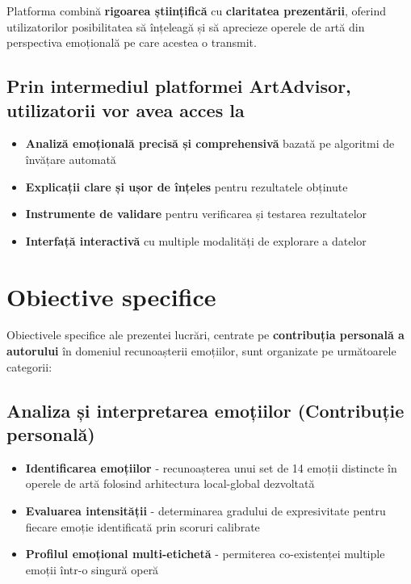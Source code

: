 Platforma combină \textbf{rigoarea științifică} cu \textbf{claritatea prezentării}, oferind utilizatorilor posibilitatea să înțeleagă și să aprecieze operele de artă din perspectiva emoțională pe care acestea o transmit.

\subsection*{Prin intermediul platformei ArtAdvisor, utilizatorii vor avea acces la}
\begin{itemize}
  \item \textbf{Analiză emoțională precisă și comprehensivă} bazată pe algoritmi de învățare automată
  \item \textbf{Explicații clare și ușor de înțeles} pentru rezultatele obținute
  \item \textbf{Instrumente de validare} pentru verificarea și testarea rezultatelor
  \item \textbf{Interfață interactivă} cu multiple modalități de explorare a datelor
\end{itemize}

\section{Obiective specifice}
\label{sec:obiective-specifice}

Obiectivele specifice ale prezentei lucrări, centrate pe \textbf{contribuția personală a autorului} în domeniul recunoașterii emoțiilor, sunt organizate pe următoarele categorii:

\subsection{Analiza și interpretarea emoțiilor (Contribuție personală)}
\begin{itemize}
  \item \textbf{Identificarea emoțiilor} - recunoașterea unui set de 14 emoții distincte în operele de artă folosind arhitectura local-global dezvoltată
  \item \textbf{Evaluarea intensității} - determinarea gradului de expresivitate pentru fiecare emoție identificată prin scoruri calibrate
  \item \textbf{Profilul emoțional multi-etichetă} - permiterea co-existenței multiple emoții într-o singură operă
\end{itemize}

